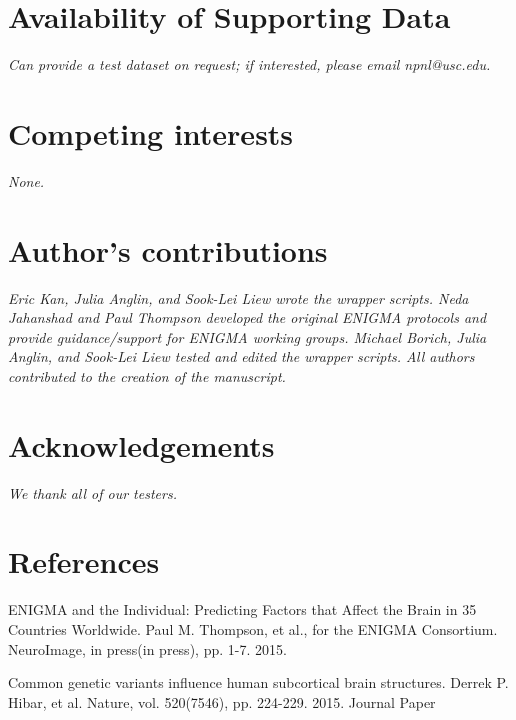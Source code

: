 \documentclass[twocolumn]{bmcart}%
\begin{document}
\begin{backmatter}

\section*{Availability of Supporting Data}
\emph{Can provide a test dataset on request; if interested, please email npnl@usc.edu.} 

\section*{Competing interests}
\emph{None.}

\section*{Author's contributions}
\emph{Eric Kan, Julia Anglin, and Sook-Lei Liew wrote the wrapper scripts. Neda Jahanshad and Paul Thompson developed the original ENIGMA protocols and provide guidance/support for ENIGMA working groups. Michael Borich, Julia Anglin, and Sook-Lei Liew tested and edited the wrapper scripts. All authors contributed to the creation of the manuscript.}

\section*{Acknowledgements}
\emph{We thank all of our testers.}

  
  


\section{References}\label{references}
ENIGMA and the Individual: Predicting Factors that Affect the Brain in 35 Countries Worldwide. Paul M. Thompson, et al., for the ENIGMA Consortium. NeuroImage, in press(in press), pp. 1-7. 2015.

Common genetic variants influence human subcortical brain structures. Derrek P. Hibar, et al. Nature, vol. 520(7546), pp. 224-229. 2015. Journal Paper


\end{backmatter}
\end{document}
